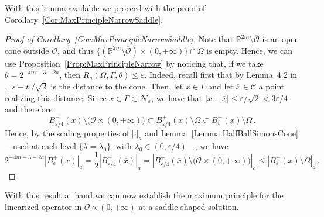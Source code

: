\documentclass[twoside,leqno,symbols-for-thanks, draft]{rmi}
\numberwithin{equation}{section}
\theoremstyle{definition}
\newcommand{\con}[1]{\mathbb{#1}}
\newcommand{\R}{\con{R}} %
\newcommand{\ccal}{\mathscr{C}}
\newcommand{\ncal}{\mathcal{N}}
\newcommand{\ocal}{\mathcal{O}}
\begin{document}
With this lemma available we proceed with the proof of Corollary~\ref{Cor:MaxPrincipleNarrowSaddle}.

\begin{proof}[Proof of Corollary~\ref{Cor:MaxPrincipleNarrowSaddle}]
	Note that $\R^{2m} \setminus \overline{\ocal}$ is an open cone outside $\ocal$, and thus $\{ (\R^{2m} \setminus \overline{\ocal}) \times (0, +\infty) \} \cap \Omega $ is empty. Hence, we can use Proposition~\ref{Prop:MaxPrincipleNarrow} by noticing that,  if we take $\theta = 2^{-4m - 3-2a}$, then $R_a(\Omega,\Gamma,\theta)\leq \varepsilon$. Indeed, recall first that by Lemma~4.2 in \cite{CabreTerraI}, $|s-t|/\sqrt{2}$ is the distance to the cone. Then, let $x\in \Gamma$ and let $\overline{x}\in \ccal$ a point realizing this distance. Since $x\in \Gamma \subset \ncal_\varepsilon$, we have that $|x-\overline{x}| \leq \varepsilon /\sqrt{2} < 3\varepsilon /4$ and therefore
	$$
	B_{\varepsilon/4}^+ (\overline{x})\setminus \big( \ocal \times (0, +\infty)\big) \subset B_{\varepsilon/4}^+ (\overline{x})\setminus \Omega \subset B_\varepsilon^+ (x)\setminus \Omega\,.
	$$
	Hence, by the scaling properties of $|\cdot|_a$ and Lemma~\ref{Lemma:HalfBallSimonsCone} ---used at each level $\{\lambda = \lambda_0\}$, with $\lambda_0\in (0,\varepsilon/4)$---, we have
	$$
	2^{-4m - 3-2a} |B^+_\varepsilon (x)|_a = \dfrac{1}{2} |B_{\varepsilon/4}^+(\overline{x}) |_a = |B_{\varepsilon/4}^+ (\overline{x})\setminus \big( \ocal \times (0, +\infty)\big)  |_a \leq |B_\varepsilon^+ (x)\setminus \Omega |_a\,.
	$$
\end{proof}


With this result at hand we can now establish the maximum principle for the linearized operator in $\ocal\times (0,+\infty)$ at a saddle-shaped solution.
\end{document}
